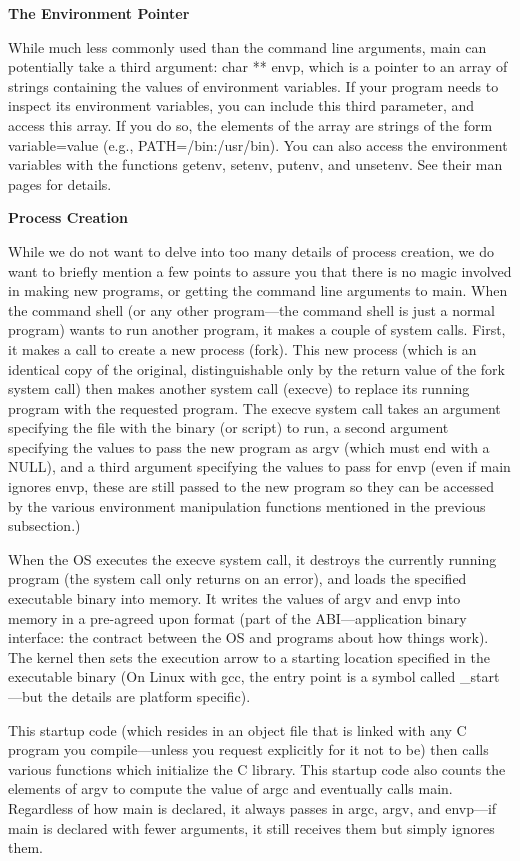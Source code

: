 \documentclass[11pt, a4paper]{article}
\begin{document}
\textbf{The Environment Pointer}


While much less commonly used than the command line arguments, main can potentially take a third argument: char ** envp, which is a pointer to an array of strings containing the values of environment variables. If your program needs to inspect its environment variables, you can include this third parameter, and access this array. If you do so, the elements of the array are strings of the form variable=value (e.g., PATH=/bin:/usr/bin). You can also access the environment variables with the functions getenv, setenv, putenv, and unsetenv. See their man pages for details.



\textbf{Process Creation}


While we do not want to delve into too many details of process creation, we do want to briefly mention a few points to assure you that there is no magic involved in making new programs, or getting the command line arguments to main. When the command shell (or any other program—the command shell is just a normal program) wants to run another program, it makes a couple of system calls. First, it makes a call to create a new process (fork). This new process (which is an identical copy of the original, distinguishable only by the return value of the fork system call) then makes another system call (execve) to replace its running program with the requested program. The execve system call takes an argument specifying the file with the binary (or script) to run, a second argument specifying the values to pass the new program as argv (which must end with a NULL), and a third argument specifying the values to pass for envp (even if main ignores envp, these are still passed to the new program so they can be accessed by the various environment manipulation functions mentioned in the previous subsection.)


When the OS executes the execve system call, it destroys the currently running program (the system call only returns on an error), and loads the specified executable binary into memory. It writes the values of argv and envp into memory in a pre-agreed upon format (part of the ABI—application binary interface: the contract between the OS and programs about how things work). The kernel then sets the execution arrow to a starting location specified in the executable binary (On Linux with gcc, the entry point is a symbol called \_start—but the details are platform specific).

This startup code (which resides in an object file that is linked with any C program you compile—unless you request explicitly for it not to be) then calls various functions which initialize the C library. This startup code also counts the elements of argv to compute the value of argc and eventually calls main. Regardless of how main is declared, it always passes in argc, argv, and envp—if main is declared with fewer arguments, it still receives them but simply ignores them.
\end{document}
